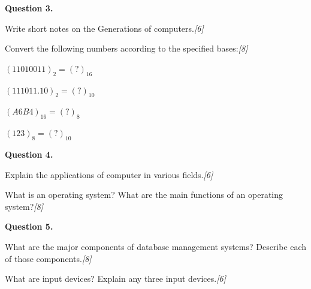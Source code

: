 \documentclass[11pt,a4paper]{article}
\newcommand{\pts}[1]{\hfill   \textit{[#1]}}
\begin{document}
\bigskip




\noindent   \textbf{Question 3.}

\begin{parts}
  \item Write short notes on the Generations of computers.\pts{6}
  \item Convert the following numbers according to the specified bases:\pts{8}
  
\begin{parts}
    \item $(11010011)_2 = (?)_{16}$
    \item $(111011.10)_2 = (?)_{10}$
    \item $(A6B4)_{16} = (?)_{8}$
    \item $(123)_8 = (?)_{10}$
  \end{parts}
\end{parts}

\bigskip




\noindent   \textbf{Question 4.}

\begin{parts}
  \item Explain the applications of computer in various fields.\pts{6}
  \item What is an operating system? What are the main functions of an operating system?\pts{8}
\end{parts}

\bigskip




\noindent   \textbf{Question 5.}

\begin{parts}
  \item What are the major components of database management systems? Describe each of those components.\pts{8}
  \item What are input devices? Explain any three input devices.\pts{6}
\end{parts}

\bigskip

\end{document}
